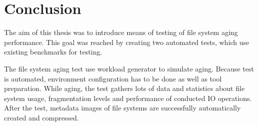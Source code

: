 \documentclass[
  color, %
  table, %
  lof,   %
  lot,   %
]{fithesis3}
\begin{document}











\chapter{Conclusion}
\label{conclusion}

The aim of this thesis was to introduce means of testing of file system aging performance. This goal was reached by creating two automated tests, which use existing benchmarks for testing.

The file system aging test use workload generator to simulate aging. Because test is automated, environment configuration has to be done as well as tool preparation. While aging, the test gathers lots of data and statistics about file system usage, fragmentation levels and performance of conducted IO operations. After the test, metadata images of file systems are successfully automatically created and compressed. 
\end{document}
